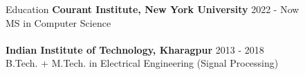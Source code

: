 \documentclass{resume} %
\begin{document}

\begin{rSection}{Education}
{\bf Courant Institute, New York University} \hfill {2022 - Now}
\\ MS in Computer Science
\\
\\{\bf Indian Institute of Technology, Kharagpur} \hfill {2013 - 2018}
\\ B.Tech. + M.Tech. in Electrical Engineering (Signal Processing)
\end{rSection}



\end{document}
